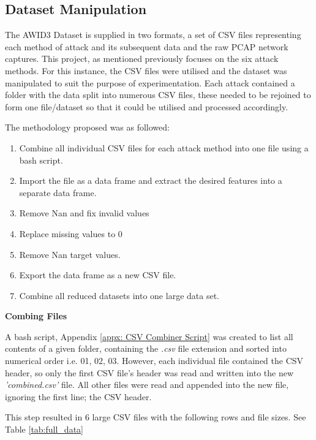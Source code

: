 \subsection{Dataset Manipulation}

The AWID3 Dataset \parencite{9360747} is supplied in two formats, a set of CSV files representing each method of attack and its subsequent data and the raw PCAP network captures. This project, as mentioned previously focuses on the six attack methods. For this instance, the CSV files were utilised and the dataset was manipulated to suit the purpose of experimentation. Each attack contained a folder with the data split into numerous CSV files, these needed to be rejoined to form one file/dataset so that it could be utilised and processed accordingly. 

\medskip
The methodology proposed was as followed:
\begin{enumerate}
    \item Combine all individual CSV files for each attack method into one file using a bash script.
    \item Import the file as a data frame and extract the desired features into a separate data frame.
    \item Remove Nan and fix invalid values
    \item Replace missing values to 0
    \item Remove Nan target values.
    \item Export the data frame as a new CSV file.
    \item Combine all reduced datasets into one large data set.
\end{enumerate}

\medskip

\textbf{Combing Files}

\smallskip
A bash script, Appendix \ref{appx: CSV Combiner Script} was created to list all contents of a given folder, containing the \textit{.csv} file extension and sorted into numerical order i.e. 01, 02, 03. However, each individual file contained the CSV header, so only the first CSV file's header was read and written into the new \textit{'combined.csv'} file. All other files were read and appended into the new file, ignoring the first line; the CSV header. 

This step resulted in 6 large CSV files with the following rows and file sizes. See Table \ref{tab:full_data}

